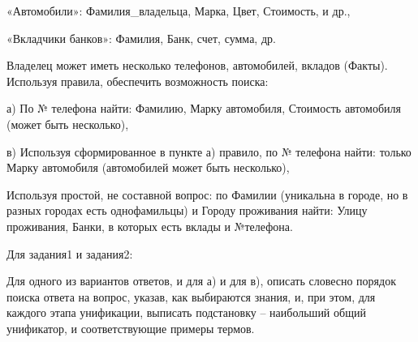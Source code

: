 \documentclass[12pt,a4paper,oneside]{report}
\begin{document}
«Автомобили»: Фамилия\_владельца, Марка, Цвет, Стоимость, и др.,

«Вкладчики банков»: Фамилия, Банк, счет, сумма, др.

Владелец может иметь несколько телефонов, автомобилей, вкладов (Факты).
Используя правила, обеспечить возможность поиска:

а) По № телефона найти: Фамилию, Марку автомобиля, Стоимость автомобиля (может быть несколько),

в) Используя сформированное в пункте а) правило, по № телефона найти: только Марку автомобиля (автомобилей может быть несколько),

Используя простой, не составной вопрос: по Фамилии (уникальна в городе, но в разных городах есть однофамильцы) и Городу проживания найти: Улицу проживания, Банки, в которых есть вклады и №телефона.

Для задания1 и задания2: 

Для одного из вариантов ответов, и для а) и для в), описать словесно порядок поиска ответа на вопрос, указав, как выбираются знания, и, при этом, для каждого этапа унификации, выписать подстановку – наибольший общий унификатор, и соответствующие примеры термов.
\end{document}
